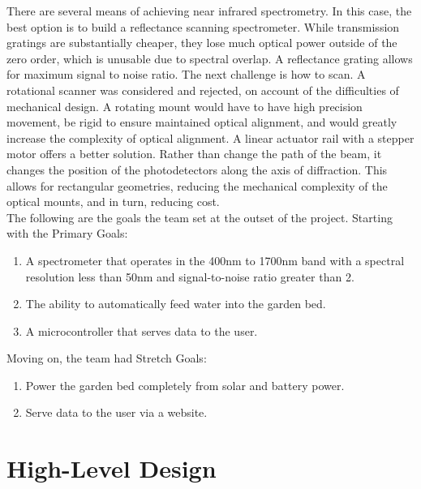 \documentclass[journal]{IEEEtran}
\begin{document}
There are several means of achieving near infrared spectrometry. In this case, the best option is to build a reflectance 
scanning spectrometer. While transmission gratings are substantially cheaper, they lose much optical power 
outside of the zero order, which is unusable due to spectral overlap. A reflectance grating allows for 
maximum signal to noise ratio. The next challenge is how to scan. A rotational scanner was considered and 
rejected, on account of the difficulties of mechanical design. A rotating mount would have to have high 
precision movement, be rigid to ensure maintained optical alignment, and would greatly increase the 
complexity of optical alignment. A linear actuator rail with a stepper motor offers a better solution. 
Rather than change the path of the beam, it changes the position of the photodetectors along the axis of 
diffraction. This allows for rectangular geometries, reducing the mechanical complexity of the optical 
mounts, and in turn, reducing cost.\\

The following are the goals the team set at the outset of the project. Starting with the Primary Goals:
\begin{enumerate}
	\item A spectrometer that operates in the 400nm to 1700nm band with a spectral resolution less
	      than 50nm and signal-to-noise ratio greater than 2.
	\item The ability to automatically feed water into the garden bed.
	\item A microcontroller that serves data to the user.
\end{enumerate}
Moving on, the team had Stretch Goals:
\begin{enumerate}
	\item Power the garden bed completely from solar and battery power.
	\item Serve data to the user via a website.
\end{enumerate}

\section{High-Level Design}
\end{document}
